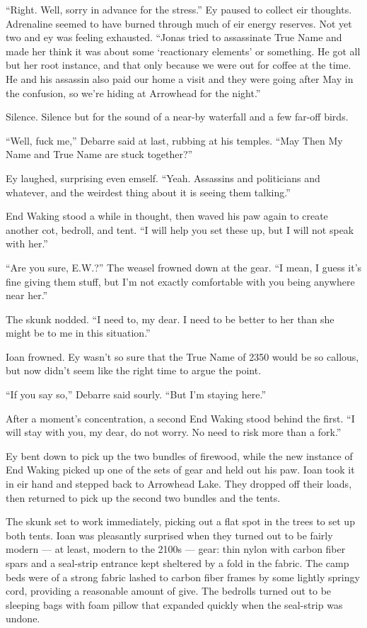 ``Right. Well, sorry in advance for the stress.'' Ey paused to collect eir thoughts. Adrenaline seemed to have burned through much of eir energy reserves. Not yet two and ey was feeling exhausted. ``Jonas tried to assassinate True Name and made her think it was about some `reactionary elements' or something. He got all but her root instance, and that only because we were out for coffee at the time. He and his assassin also paid our home a visit and they were going after May in the confusion, so we're hiding at Arrowhead for the night.''

Silence. Silence but for the sound of a near-by waterfall and a few far-off birds.

``Well, fuck me,'' Debarre said at last, rubbing at his temples. ``May Then My Name and True Name are stuck together?''

Ey laughed, surprising even emself. ``Yeah. Assassins and politicians and whatever, and the weirdest thing about it is seeing them talking.''

End Waking stood a while in thought, then waved his paw again to create another cot, bedroll, and tent. ``I will help you set these up, but I will not speak with her.''

``Are you sure, E.W.?'' The weasel frowned down at the gear. ``I mean, I guess it's fine giving them stuff, but I'm not exactly comfortable with you being anywhere near her.''

The skunk nodded. ``I need to, my dear. I need to be better to her than she might be to me in this situation.''

Ioan frowned. Ey wasn't so sure that the True Name of 2350 would be so callous, but now didn't seem like the right time to argue the point.

``If you say so,'' Debarre said sourly. ``But I'm staying here.''

After a moment's concentration, a second End Waking stood behind the first. ``I will stay with you, my dear, do not worry. No need to risk more than a fork.''

Ey bent down to pick up the two bundles of firewood, while the new instance of End Waking picked up one of the sets of gear and held out his paw. Ioan took it in eir hand and stepped back to Arrowhead Lake. They dropped off their loads, then returned to pick up the second two bundles and the tents.

The skunk set to work immediately, picking out a flat spot in the trees to set up both tents. Ioan was pleasantly surprised when they turned out to be fairly modern — at least, modern to the 2100s — gear: thin nylon with carbon fiber spars and a seal-strip entrance kept sheltered by a fold in the fabric. The camp beds were of a strong fabric lashed to carbon fiber frames by some lightly springy cord, providing a reasonable amount of give. The bedrolls turned out to be sleeping bags with foam pillow that expanded quickly when the seal-strip was undone.


